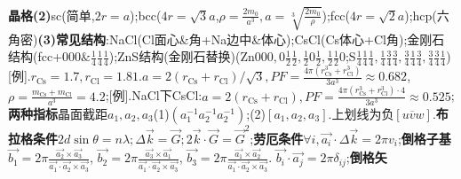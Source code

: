 \documentclass[UTF8,a4paper,10pt,onecolumn]{ctexart}
\begin{document}
\textbf{晶格}\textbf{(2)}sc(简单,$2r=a$);bcc($4r=\sqrt{3}a$,$\rho=\frac{2m_0}{a^3},a=\sqrt[3]{\frac{2m_0}{\rho}}$);fcc($4r=\sqrt{2}a$);hcp(六角密)\textbf{(3)常见结构}:NaCl(Cl面心\&角+Na边中\&体心);CsCl(Cs体心+Cl角);金刚石结构(fcc+$000\&\frac{1}{4}\frac{1}{4}\frac{1}{4}$);ZnS结构(金刚石替换)(Zn$000,0\frac{1}{2}\frac{1}{2},\frac{1}{2}0\frac{1}{2},\frac{1}{2}\frac{1}{2}0$;S$\frac{1}{4}\frac{1}{4}\frac{1}{4},\frac{1}{4}\frac{3}{4}\frac{3}{4},\frac{3}{4}\frac{1}{4}\frac{3}{4},\frac{3}{4}\frac{3}{4}\frac{1}{4}$)[例].$r_{\text{Cs}}=1.7,r_{\text{Cl}}=1.81.a=2(r_{\text{Cs}}+r_{\text{Cl}})/\sqrt{3},PF=\frac{4\pi(r_{\text{Cs}}^3+r_{\text{Cl}}^3)}{3a^3}\approx 0.682$,$\rho=\frac{m_{\text{Cs}}+m_{\text{Cl}}}{a^3}=4.2$;[例].NaCl下CsCl:$a=2(r_{\text{Cs}}+r_{\text{Cl}}),PF=\frac{4\pi(r_{\text{Cs}}^3+r_{\text{Cl}}^3)\cdot 4}{3a^3}\approx 0.525$;\textbf{两种指标}晶面截距$a_1,a_2,a_3$(1)$(a_1^{-1}a_{2}^{-1}a_2^{-1})$;(2)$[a_1,a_2,a_3]$.上划线为负$[u\overline{v}w]$.\textbf{布拉格条件}$2d\sin{\theta}=n\lambda;\Delta\vec{k}=\vec{G};2\vec{k}\cdot\vec{G}=\vec{G}^2$;\textbf{劳厄条件}$\forall i,\vec{a_i}\cdot\Delta\vec{k}=2\pi v_i$;\textbf{倒格子基}
  $\vec{b_1}=2\pi\frac{\vec{a_2}\times\vec{a_3}}{\vec{a_1}\cdot\vec{a_2}\times\vec{a_3}}$,
  $\vec{b_2}=2\pi\frac{\vec{a_3}\times\vec{a_1}}{\vec{a_1}\cdot\vec{a_2}\times\vec{a_3}}$,
  $\vec{b_3}=2\pi\frac{\vec{a_1}\times\vec{a_2}}{\vec{a_1}\cdot\vec{a_2}\times\vec{a_3}}$.
  $\vec{b_i}\cdot\vec{a_j}=2\pi\delta_{ij}$;\textbf{倒格矢}
\end{document}
